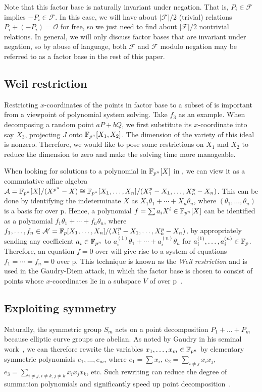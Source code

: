 Note that this factor base is naturally invariant under negation.
%
That is, $P_i\in\mathcal F$ implies $-P_i\in\mathcal F$.
%
In this case, we will have about $|\mathcal F|/2$ (trivial) relations
$P_i+(-P_i)=\mathcal O$ for free, so we just need to find about
$|\mathcal F|/2$ nontrivial relations.
%
In general, we will only discuss factor bases that are invariant under
negation, so by abuse of language, both $\mathcal F$ and $\mathcal F$
modulo negation may be referred to as a factor base in the rest of
this paper.

\subsection{Weil restriction}
\label{sec:weil-restriction}
%
Restricting $x$-coordinates of the points in factor base to a subset
of  is important from a viewpoint of polynomial system solving.
%
Take $f_3$ as an example.
%
When decomposing a random point $aP+bQ$, we first substitute its
$x$-coordinate into say $X_3$, projecting $J$ onto $\mathbb F_{p^n}[X_1,X_2]$.
%
The dimension of the variety of this ideal is nonzero.
%
Therefore, we would like to pose some restrictions on $X_1$ and $X_2$
to reduce the dimension to zero and make the solving time more
manageable.

When looking for solutions to a polynomial in $\mathbb F_{p^n}[X]$ in ,
we can view it as a commutative affine algebra
$\mathcal A=\mathbb F_{p^n}[X]/(X^{p^n} -
X)\cong\mathbb F_{p^n}[X_1,\ldots,X_n]/(X_1^p - X_1,\ldots,X_n^p - X_n)$.
%
This can be done by identifying the indeterminate $X$ as
$X_1\theta_1+\cdots+X_n\theta_n$, where $(\theta_1,\ldots,\theta_n)$
is a basis for  over \F p.
%
Hence, a polynomial $f=\sum a_iX^i\in\mathbb F_{p^n}[X]$ can be identified as
a polynomial $f_1\theta_1+\cdots+f_n\theta_n$, where
$f_1,\ldots,f_n\in\mathcal A'=\mathbb F_{p}[X_1,\ldots,X_n]/(X_1^p -
X_1,\ldots,X_n^p - X_n)$, by appropriately sending any coefficient
$a_i\in\mathbb F_{p^n}$ to $a_i^{(1)}\theta_1+\cdots+a_i^{(n)}\theta_n$ for
$a_i^{(1)},\ldots,a_i^{(n)}\in\mathbb F_{p}$.
%
Therefore, an equation $f=0$ over  will give rise to a system
of equations $f_1=\cdots=f_n=0$ over \F p.
%
This technique is known as the \emph{Weil restriction} and is used in
the Gaudry-Diem attack, in which the factor base is chosen to consist
of points whose $x$-coordinates lie in a subspace $V$ of  over
\F p~\cite{DBLP:journals/jsc/Gaudry09,DBLP:journals/moc/Diem11}.

\subsection{Exploiting symmetry}
%
\label{sec:exploit-symmetry}
%
Naturally, the symmetric group $S_m$ acts on a point decomposition
$P_1+\ldots+P_m$ because elliptic curve groups are abelian.
%
As noted by Gaudry in his seminal
work~\cite{DBLP:journals/jsc/Gaudry09}, we can therefore rewrite the
variables $x_1,\ldots,x_m\in\mathbb F_{p^n}$ by elementary symmetric
polynomials $e_1,\ldots,e_m$, where $e_1=\sum x_i$,
$e_2=\sum_{i\neq j}x_ix_j$,
$e_3=\sum_{i\neq j,i\neq k,j\neq k}x_ix_jx_k$, etc.
%
Such rewriting can reduce the degree of summation polynomials and
significantly speed up point
decomposition~\cite{DBLP:conf/eurocrypt/FaugerePPR12,DBLP:conf/iwsec/HuangPST13}.

